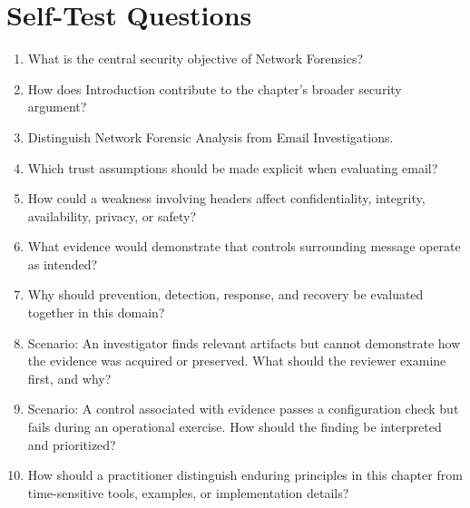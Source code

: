\documentclass[11pt]{article}
\begin{document}
\section*{Self-Test Questions}
\begin{enumerate}
\item What is the central security objective of Network Forensics?
\item How does Introduction contribute to the chapter's broader security argument?
\item Distinguish Network Forensic Analysis from Email Investigations.
\item Which trust assumptions should be made explicit when evaluating email?
\item How could a weakness involving headers affect confidentiality, integrity, availability, privacy, or safety?
\item What evidence would demonstrate that controls surrounding message operate as intended?
\item Why should prevention, detection, response, and recovery be evaluated together in this domain?
\item Scenario: An investigator finds relevant artifacts but cannot demonstrate how the evidence was acquired or preserved. What should the reviewer examine first, and why?
\item Scenario: A control associated with evidence passes a configuration check but fails during an operational exercise. How should the finding be interpreted and prioritized?
\item How should a practitioner distinguish enduring principles in this chapter from time-sensitive tools, examples, or implementation details?
\end{enumerate}
\end{document}
